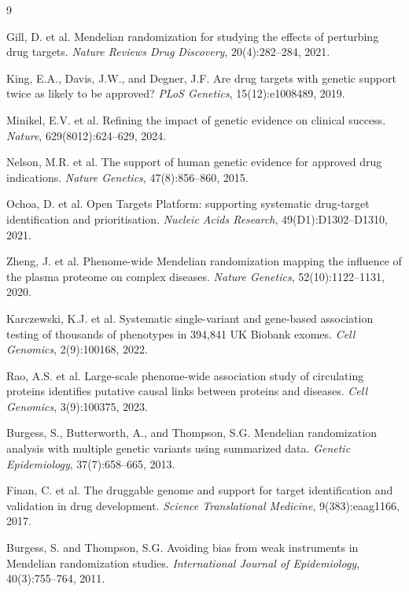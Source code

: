 \documentclass[11pt]{article}
\begin{document}
\begin{thebibliography}{9}

Gill, D. et al.
\newblock Mendelian randomization for studying the effects of perturbing drug targets.
\newblock \emph{Nature Reviews Drug Discovery}, 20(4):282--284, 2021.

King, E.A., Davis, J.W., and Degner, J.F.
\newblock Are drug targets with genetic support twice as likely to be approved?
\newblock \emph{PLoS Genetics}, 15(12):e1008489, 2019.

Minikel, E.V. et al.
\newblock Refining the impact of genetic evidence on clinical success.
\newblock \emph{Nature}, 629(8012):624--629, 2024.

Nelson, M.R. et al.
\newblock The support of human genetic evidence for approved drug indications.
\newblock \emph{Nature Genetics}, 47(8):856--860, 2015.

Ochoa, D. et al.
\newblock Open Targets Platform: supporting systematic drug-target identification and prioritisation.
\newblock \emph{Nucleic Acids Research}, 49(D1):D1302--D1310, 2021.

Zheng, J. et al.
\newblock Phenome-wide Mendelian randomization mapping the influence of the plasma proteome on complex diseases.
\newblock \emph{Nature Genetics}, 52(10):1122--1131, 2020.

Karczewski, K.J. et al.
\newblock Systematic single-variant and gene-based association testing of thousands of phenotypes in 394,841 UK Biobank exomes.
\newblock \emph{Cell Genomics}, 2(9):100168, 2022.

Rao, A.S. et al.
\newblock Large-scale phenome-wide association study of circulating proteins identifies putative causal links between proteins and diseases.
\newblock \emph{Cell Genomics}, 3(9):100375, 2023.

Burgess, S., Butterworth, A., and Thompson, S.G.
\newblock Mendelian randomization analysis with multiple genetic variants using summarized data.
\newblock \emph{Genetic Epidemiology}, 37(7):658--665, 2013.

Finan, C. et al.
\newblock The druggable genome and support for target identification and validation in drug development.
\newblock \emph{Science Translational Medicine}, 9(383):eaag1166, 2017.

Burgess, S. and Thompson, S.G.
\newblock Avoiding bias from weak instruments in Mendelian randomization studies.
\newblock \emph{International Journal of Epidemiology}, 40(3):755--764, 2011.

\end{thebibliography}
\end{document}
